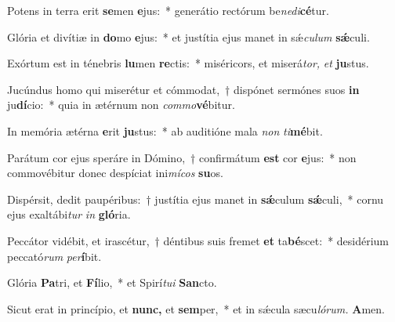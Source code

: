 \item Potens in terra erit \textbf{se}men \textbf{e}jus:~* generátio rectórum be\hspace{0.03em}\textit{nedi}\textbf{cé}tur.
\item Glória et divítiæ in \textbf{do}mo \textbf{e}jus:~* et justítia ejus manet in sǽ\hspace{0.03em}\textit{culum} \textbf{sǽ}culi.
\item Exórtum est in ténebris \textbf{lu}men \textbf{re}ctis:~* miséricors, et miserá\hspace{0.03em}\textit{tor,} \textit{et} \textbf{ju}stus.
\item Jucúndus homo qui miserétur et cómmodat,~† dispónet sermónes suos \textbf{in} ju\textbf{dí}cio:~* quia in ætérnum non \textit{commo}\textbf{vé}bitur.
\item In memória ætérna \textbf{e}rit \textbf{ju}stus:~* ab auditióne mala \textit{non} \textit{ti}\textbf{mé}bit.
\item Parátum cor ejus speráre in Dómino,~† confirmátum \textbf{est} cor \textbf{e}jus:~* non commovébitur donec despíciat ini\textit{mícos} \textbf{su}os.
\item Dispérsit, dedit paupéribus:~† justítia ejus manet in \textbf{sǽ}culum \textbf{sǽ}culi,~* cornu ejus exaltábi\hspace{0.03em}\textit{tur} \textit{in} \textbf{gló}ria.
\item Peccátor vidébit, et irascétur,~† déntibus suis fremet \textbf{et} ta\textbf{bé}scet:~* desidérium peccató\textit{rum} \textit{per}\textbf{í}bit.
\item Glória \textbf{Pa}tri, et \textbf{Fí}lio,~* et Spirí\hspace{0.03em}\textit{tui} \textbf{San}cto.
\item Sicut erat in princípio, et \textbf{nunc,} et \textbf{sem}per,~* et in sǽcula sæcu\hspace{0.03em}\textit{lórum.} \textbf{A}men.